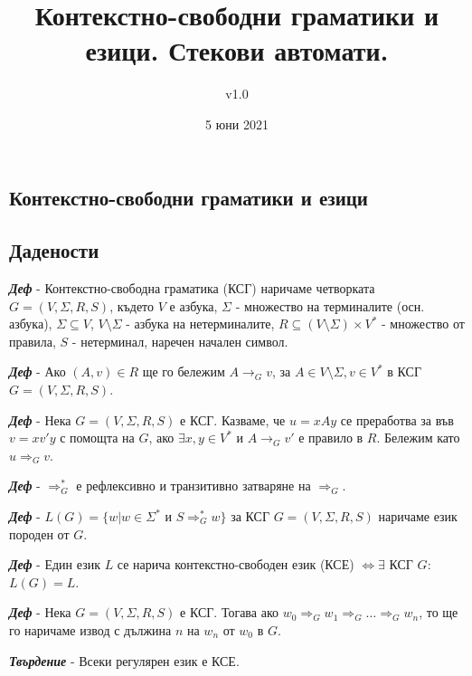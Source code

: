 \documentclass[fleqn,12pt]{article}
\title{Контекстно-свободни граматики и езици. Стекови автомати.}
\author{v1.0}
\date{5 юни 2021}
\begin{document}
\maketitle

\tableofcontents
\pagebreak
\begin{flushleft}

\section{Контекстно-свободни граматики и езици}
\subsection{Дадености}

\textit{\textbf{Деф}} - Контекстно-свободна граматика (КСГ) наричаме четворката $G = (V, \Sigma, R, S)$, където $V$ е азбука, $\Sigma$ - множество на терминалите (осн. азбука), $\Sigma \subseteq V$, $V \setminus \Sigma$ - азбука на нетерминалите, $R \subseteq (V \setminus \Sigma) \times V^*$ - множество от правила, $S$ - нетерминал, наречен начален символ.

\textit{\textbf{Деф}} - Ако $(A, v) \in R$ ще го бележим $A \to_G v$, за $A \in V \setminus \Sigma, v \in V^*$ в КСГ $G=(V, \Sigma, R, S)$.

\textit{\textbf{Деф}} - Нека $G = (V, \Sigma, R, S)$ е КСГ. Казваме, че $u = xAy$ се преработва за във $v = xv'y$ с помощта на $G$, ако $\exists x, y \in V^*$ и $A \to_G v'$ е правило в $R$. Бележим като $u \Rightarrow_G v$.

\textit{\textbf{Деф}} - $\Rightarrow_G^*$ е рефлексивно и транзитивно затваряне на $\Rightarrow_G$.

\textit{\textbf{Деф}} - $L(G) = \{w | w \in \Sigma^*$ и $ S \Rightarrow_G^* w\}$ за КСГ $G = (V, \Sigma, R, S)$ наричаме език породен от $G$.

\textit{\textbf{Деф}} - Един език $L$ се нарича контекстно-свободен език (КСЕ) $\iff \exists$ КСГ $G$: $L(G) = L$.

\textit{\textbf{Деф}} - Нека $G = (V, \Sigma, R, S)$ е КСГ. Тогава ако $w_0 \Rightarrow_G w_1 \Rightarrow_G \dots \Rightarrow_G w_n$, то ще го наричаме извод с дължина $n$ на $w_n$ от $w_0$ в $G$.

\textit{\textbf{Твърдение}} - Всеки регулярен език е КСЕ. 


\end{flushleft}
\end{document}
